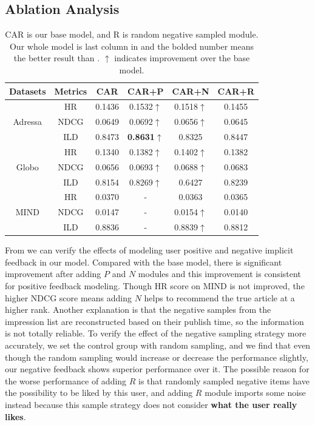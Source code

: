 \subsection{Ablation Analysis}
\begin{table}[th]\setlength{\tabcolsep}{3.5pt}
  \caption{CAR is our base model, and R is
  random negative sampled module. Our whole model is last column in  and the bolded number means the better result than . 
  $\uparrow$ indicates improvement over the base model.}
    \label{ablation}
    \renewcommand{\arraystretch}{1.2}
    \centering
    \begin{tabular}{cc|cccc}
    \toprule
    Datasets&Metrics&CAR&CAR+P&CAR+N&CAR+R \\ 
    \midrule
    \multirow{3}{*}{Adressa} & HR & 0.1436 & 0.1532$\uparrow$ & 0.1518$\uparrow$ & 0.1455 \\ 
    \cline{2-6}
    & NDCG & 0.0649 & 0.0692$\uparrow$ & 0.0656$\uparrow$ & 0.0645 \\ 
    \cline{2-6}
    & ILD & 0.8473 & \textbf{0.8631}$\uparrow$ & 0.8325 & 0.8447\\ 
    \midrule
    \multirow{3}{*}{Globo} & HR & 0.1340 & 0.1382$\uparrow$ & 0.1402$\uparrow$ & 0.1382 \\ 
    \cline{2-6}
    & NDCG & 0.0656 & 0.0693$\uparrow$ & 0.0688$\uparrow$ & 0.0683 \\ 
    \cline{2-6}
    & ILD & 0.8154 & 0.8269$\uparrow$ & 0.6427 & 0.8239\\ 
    \midrule
    \multirow{3}{*}{MIND} & HR & 0.0370 & - & 0.0363 & 0.0365\\ 
    \cline{2-6}
    & NDCG & 0.0147 & - & 0.0154$\uparrow$ & 0.0140 \\
    \cline{2-6} 
    & ILD & 0.8836 & -  & 0.8839$\uparrow$ & 0.8812 \\ 
    \bottomrule
  \end{tabular}
  \end{table}
From  we can verify the effects of modeling user positive and negative implicit feedback in our model. Compared with the base model, there is significant improvement after adding $P$ and $N$ modules and this improvement is consistent for positive feedback modeling. Though HR score on MIND is not improved, the higher NDCG score means adding $N$ helps to recommend the true article at a higher rank. Another explanation is that the negative samples from the impression list are reconstructed based on their publish time, so the information is not totally reliable. To verify the effect of the negative sampling strategy more accurately, we set the control group with random sampling, and we find that even though the random sampling would increase or decrease the performance slightly, our negative feedback shows superior performance over it. The possible reason for the worse performance of adding $R$ is that randomly sampled negative items have the possibility to be liked by this user, and adding $R$ module imports some noise instead because this sample strategy does not consider \textbf{what the user really likes}.
